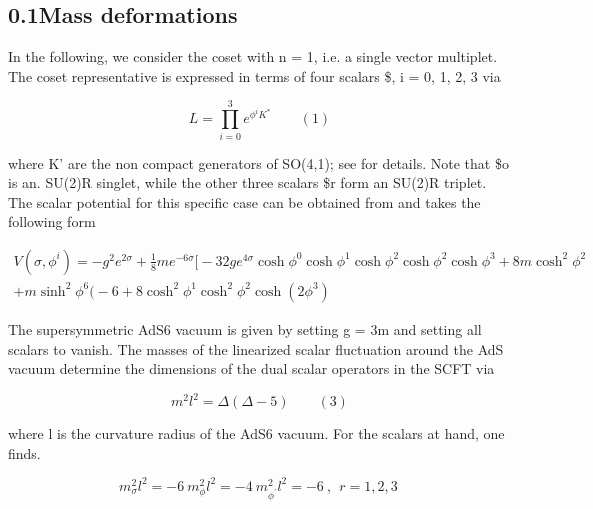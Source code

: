 \documentclass{article}
\begin{document}
\sloppy

\subsection*{0.1Mass deformations}


In the following, we consider the coset with n = 1, i.e. a single vector multiplet. The coset
representative is expressed in terms of four scalars \$, i = 0, 1, 2, 3 via


\begin{equation}
L = \prod _ { i = 0 } ^ { 3 } e ^ { \phi ^ { i } K ^ { * } } \qquad ( 1 )
\end{equation}


where K' are the non compact generators of SO(4,1); see for details. Note that \$o is an.
SU(2)R singlet, while the other three scalars \$r form an SU(2)R triplet. The scalar potential
for this specific case can be obtained from and takes the following form


\begin{equation}
\begin{array} { r } { V ( \sigma, \phi ^ { i } ) = - g ^ { 2 } e ^ { 2 \sigma } + \frac { 1 } { 8 } m e ^ { - 6 \sigma } \Bigg [ - 3 2 g e ^ { 4 \sigma } \cosh \phi ^ { 0 } \cosh \phi ^ { 1 } \cosh \phi ^ { 2 } \cosh \phi ^ { 2 } \cosh \phi ^ { 3 } + 8 m \cosh ^ { 2 } \phi ^ { 2 } } \\ { + m \sinh ^ { 2 } \phi ^ { 6 } \Bigg ( - 6 + 8 \cosh ^ { 2 } \phi ^ { 1 } \cosh ^ { 2 } \phi ^ { 2 } \cosh ( 2 \phi ^ { 3 } )}\end{array}
\end{equation}


The supersymmetric AdS6 vacuum is given by setting g = 3m and setting all scalars to
vanish. The masses of the linearized scalar fluctuation around the AdS vacuum determine
the dimensions of the dual scalar operators in the SCFT via


\begin{equation}
m ^ { 2 } l ^ { 2 } = \Delta ( \Delta - 5 ) \qquad ( 3 )
\end{equation}


where l is the curvature radius of the AdS6 vacuum. For the scalars at hand, one finds.


\begin{equation}
m _ { \sigma } ^ { 2 } l ^ { 2 } = - 6 ~ m _ { \phi } ^ { 2 } l ^ { 2 } = - 4 ~ m _ { \phi ^ { \prime } } ^ { 2 } l ^ { 2 } = - 6 ~, ~ ~ r = 1, 2, 3 ~
\end{equation}
\end{document}
